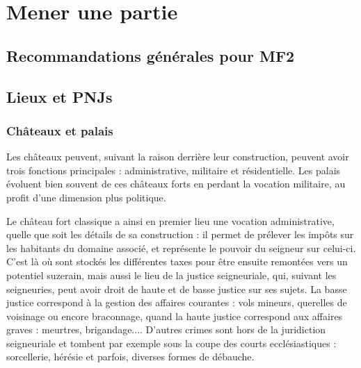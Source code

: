 \documentclass[10pt,a4paper]{book}
\newcommand{\titre}{MF2}
\begin{document}
\chapter{Mener une partie}
\begin{multicols}{2}
\section{Recommandations générales pour \titre}
\section{Lieux et PNJs}
\subsection{Châteaux et palais}
Les châteaux peuvent, suivant la raison derrière leur construction, peuvent avoir trois fonctions principales : administrative, militaire et résidentielle.  Les palais évoluent bien souvent de ces châteaux forts en perdant la vocation militaire, au profit d'une dimension plus politique.

Le château fort classique a ainsi en premier lieu une vocation administrative, quelle que soit les détails de sa construction : il permet de prélever les impôts sur les habitants du domaine associé, et représente le pouvoir du seigneur sur celui-ci. C'est là où sont stockés les différentes taxes pour être ensuite remontées vers un potentiel suzerain, mais aussi le lieu de la justice seigneuriale, qui, suivant les seigneuries, peut avoir droit de haute et de basse justice sur ses sujets. La basse justice correspond à la gestion des affaires courantes : vols mineurs, querelles de voisinage ou encore braconnage, quand la haute justice correspond aux affaires graves : meurtres, brigandage.... D'autres crimes sont hors de la juridiction seigneuriale et tombent par exemple sous la coupe des courts ecclésiastiques : sorcellerie, hérésie et parfois, diverses formes de débauche.


\end{multicols}
\end{document}
